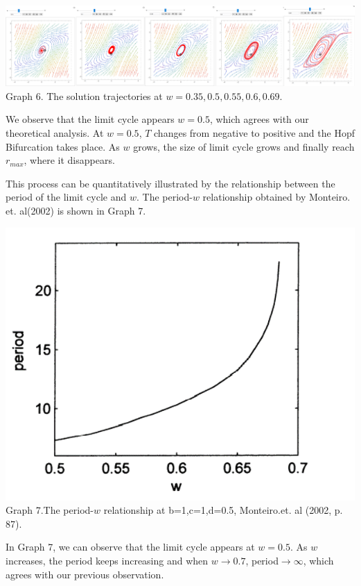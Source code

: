\documentclass[12pt]{article}
\begin{document}
\begin{center}
  \includegraphics[scale=0.5]{ LimitCycleExplanation.png}\\
  \footnotesize{Graph 6. The solution trajectories at $w=0.35,0.5,0.55,0.6,0.69$.}
  \end{center}

  We observe that the limit cycle appears $w=0.5$, which agrees with our theoretical analysis. At $w=0.5$, $T$ changes from negative to positive and the Hopf Bifurcation takes place. As $w$ grows, the size of limit cycle grows and finally reach $r_{max}$, where it disappears.

  This process can be quantitatively illustrated by the relationship between the period of the limit cycle and $w$. The period-$w$ relationship obtained by Monteiro. et. al(2002) is shown in Graph 7. 

  \begin{center}
    \includegraphics[scale=0.5]{ PeriodExplanation.png}\\
    \footnotesize{Graph 7.The period-$w$ relationship at b=1,c=1,d=0.5, Monteiro.et. al (2002, p. 87).}
    \end{center}

In Graph 7, we can observe that the limit cycle appears at $w=0.5$. As $w$ increases, the period keeps increasing and when $w\to 0.7$, period$\to\infty$, which agrees with our previous observation.
\end{document}
